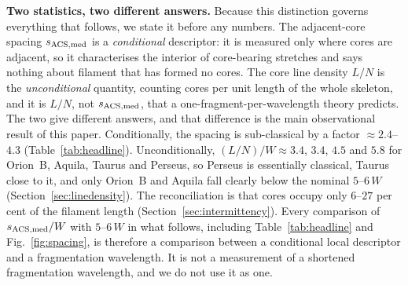 \documentclass[usenatbib,twoside,twocolumn]{mnras}
\begin{document}
\smallskip\noindent\textbf{Two statistics, two different answers.} Because this distinction governs everything that follows, we state it before any numbers. The adjacent-core spacing $s_{\rm ACS,med}$ is a \emph{conditional} descriptor: it is measured only where cores are adjacent, so it characterises the interior of core-bearing stretches and says nothing about filament that has formed no cores. The core line density $L/N$ is the \emph{unconditional} quantity, counting cores per unit length of the whole skeleton, and it is $L/N$, not $s_{\rm ACS,med}$, that a one-fragment-per-wavelength theory predicts. The two give different answers, and that difference is the main observational result of this paper. Conditionally, the spacing is sub-classical by a factor $\approx2.4$--$4.3$ (Table~\ref{tab:headline}). Unconditionally, $(L/N)/W\approx3.4$, $3.4$, $4.5$ and $5.8$ for Orion~B, Aquila, Taurus and Perseus, so Perseus is essentially classical, Taurus close to it, and only Orion~B and Aquila fall clearly below the nominal $5$--$6\,W$ (Section~\ref{sec:linedensity}). The reconciliation is that cores occupy only $6$--$27$ per cent of the filament length (Section~\ref{sec:intermittency}). Every comparison of $s_{\rm ACS,med}/W$ with $5$--$6\,W$ in what follows, including Table~\ref{tab:headline} and Fig.~\ref{fig:spacing}, is therefore a comparison between a conditional local descriptor and a fragmentation wavelength. It is not a measurement of a shortened fragmentation wavelength, and we do not use it as one.
\end{document}
